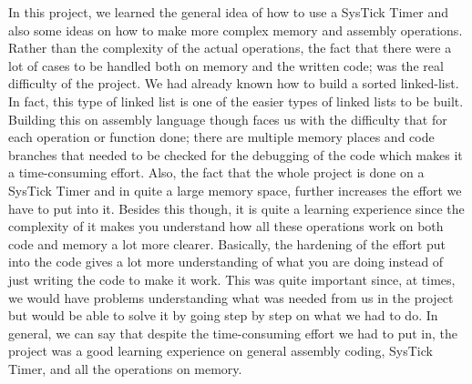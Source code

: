 \documentclass[pdftex,12pt,a4paper]{article}
\begin{document}
In this project, we learned the general idea of how to use a SysTick Timer and also some ideas on how to make more complex memory and assembly operations. Rather than the complexity of the actual operations, the fact that there were a lot of cases to be handled both on memory and the written code; was the real difficulty of the project. We had already known how to build a sorted linked-list. In fact, this type of linked list is one of the easier types of linked lists to be built. Building this on assembly language though faces us with the difficulty that for each operation or function done; there are multiple memory places and code branches that needed to be checked for the debugging of the code which makes it a time-consuming effort. Also, the fact that the whole project is done on a SysTick Timer and in quite a large memory space, further increases the effort we have to put into it. Besides this though, it is quite a learning experience since the complexity of it makes you understand how all these operations work on both code and memory a lot more clearer. Basically, the hardening of the effort put into the code gives a lot more understanding of what you are doing instead of just writing the code to make it work. This was quite important since, at times, we would have problems understanding what was needed from us in the project but would be able to solve it by going step by step on what we had to do. In general, we can say that despite the time-consuming effort we had to put in, the project was a good learning experience on general assembly coding, SysTick Timer, and all the operations on memory.
\end{document}
